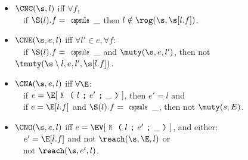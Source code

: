 \newcommand{\qindent}{\\\indent$\quad$}
\SSI\begin{itemize}
\item $\CNC(\s, l)$ iff $\forall f$,
\qindent if  $\S(l).f = \Kw{capsule}\,\_$ then $l \notin \rog(\s, \s[l.f])$.
\item $\CNE(\s, e, l)$ iff $\forall l' \in e,\forall f$:
\qindent  if $\S(l).f = \Kw{capsule}\,\_$ and $\muty(\s, e, l')$, then not $\tmuty(\s\setminus l, e, l', \s[l.f])$.
\item $\CNA(\s, e, l)$ iff $\forall \E$:
\qindent if $e = \E[\M{l}{e'}{\_}]$, then $e' = l$ and
\qindent if $e = \E[l.f]$ and $\S(l).f = \Kw{capsule}\,\_$, then not $\muty(s, E)$.

\item $\CNO(\s, e, l)$ iff $e = \EV[\M{l}{e'}{\_}]$, and either:
\qindent $e' = \E[l.f]$ and not $\reach(\s, \E, l)$ or 
\qindent not $\reach(\s, e', l)$.

\end{itemize}

